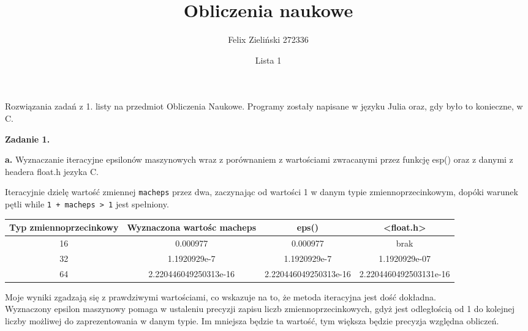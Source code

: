 \documentclass[15pt, a4paper]{article}
\title{Obliczenia naukowe}
\author{Felix Zieliński 272336}
\date{Lista 1}
\begin{document}
\maketitle
Rozwiązania zadań z 1. listy na przedmiot Obliczenia Naukowe. Programy zostały napisane w języku Julia oraz, gdy było to konieczne, w C.

\vspace{0.5cm}

\noindent\hrulefill


\vspace{0.5cm}

\noindent\textbf{Zadanie 1.} 

\textbf{a.} Wyznaczanie iteracyjne epsilonów maszynowych wraz z porównaniem z wartościami zwracanymi przez funkcję esp() oraz z danymi z headera float.h jezyka C.

\vspace{0.5cm}

Iteracyjnie dzielę wartość zmiennej \verb|macheps| przez dwa, zaczynając od wartości 1 w danym typie zmiennoprzecinkowym, dopóki warunek pętli while \verb|1 + macheps > 1| jest spełniony. 

\begin{table}[ht]
    \begin{adjustbox}{max width=\textwidth}
    \begin{tabular}{|c|c|c|c|}
        \hline 
        Typ zmiennoprzecinkowy & Wyznaczona wartośc macheps & eps() & <float.h> \\ \hline
        16 & 0.000977 & 0.000977 & brak \\ \hline
        32 & 1.1920929e-7 & 1.1920929e-7 & 1.1920929e-07  \\ \hline
        64 & 2.220446049250313e-16 & 2.220446049250313e-16 &  2.2204460492503131e-16 \\ \hline
    \end{tabular}
    \end{adjustbox}
    \label{tab:macheps}
\end{table}

Moje wyniki zgadzają się z prawdziwymi wartościami, co wskazuje na to, że metoda iteracyjna jest dość dokładna. \\
Wyznaczony epsilon maszynowy pomaga w ustaleniu precyzji zapisu liczb zmiennoprzecinkowych, gdyż jest odległością od 1 do kolejnej liczby możliwej do zaprezentowania w danym typie. Im mniejsza będzie ta wartość, tym większa będzie precyzja względna obliczeń. 
\end{document}
